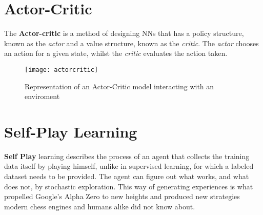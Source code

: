 \section{Actor-Critic}
The \textbf{Actor-critic} is a method of designing NNs that has a policy structure, known as the \textit{actor}
and a value structure, known as the \textit{critic}.
The \textit{actor} chooses an action for a given state, whilst the \textit{critic} evaluates the action taken.
\begin{figure}[!ht]
    \centering
    \texttt{[image: actorcritic]}
    \caption{Representation of an Actor-Critic model interacting with an enviroment \cite{actorcritic}}
\end{figure}


\section{Self-Play Learning}
\textbf{Self Play} learning describes the process of an agent that collects the training data itself by playing
himself, unlike in supervised learning, for which a labeled dataset needs to be provided.
The agent can figure out what works, and what does not, by stochastic exploration.
This way of generating experiences is what propelled Google's Alpha Zero to new heights and produced new strategies
modern chess engines and humans alike did not know about.\cite{Silver2017}


